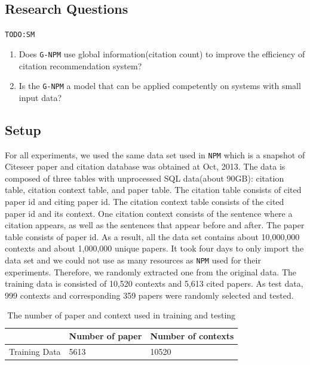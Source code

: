 \documentclass{llncs}
\newcommand{\name}{\texttt{G-NPM}\xspace}
\newcommand{\npm}{\texttt{NPM}\xspace}
\newcommand{\todo}[1]{\texttt{\color{red}TODO:#1}}
\begin{document}
\subsection{Research Questions}
\todo{SM}

\begin{enumerate}
\item Does \name use global information(citation count) to improve the efficiency of citation recommendation system?
\item Is the \name a model that can be applied competently on systems with small input data?
\end{enumerate}

\subsection{Setup}
\label{sec:setup}
For all experiments, we used the same data set used in \npm which is a snapshot of Citeseer paper and citation database was obtained at Oct, 2013. The data is composed of three tables with unprocessed SQL data(about 90GB): citation table, citation context table, and paper table. The citation table consists of cited paper id and citing paper id. The citation context table consists of the cited paper id and its context. One citation context consists of the sentence where a citation appears, as well as the sentences that appear before and after. The paper table consists of paper id. As a result, all the data set contains about 10,000,000 contexts and about 1,000,000 unique papers.
It took four days to only import the data set and we could not use as many resources as \npm used for their experiments. Therefore, we randomly extracted one from the original data. The training data is consisted of 10,520 contexts and 5,613 cited papers. As test data, 999 contexts and corresponding 359 papers were randomly selected and tested.

\begin{table}[ht]
\centering
\begin{tabular}{l || p{} | p{}}
\toprule
& Number of paper & Number of contexts \\
\midrule
Training Data & 5613 & 10520 \\
\bottomrule
\end{tabular}
\caption{The number of paper and context used in training and testing}\label{table:data}
\vspace{-2em}
\end{table}
\end{document}
